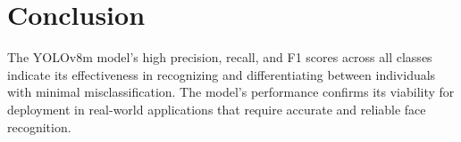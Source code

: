 \section{Conclusion}
The YOLOv8m model’s high precision, recall, and F1 scores across all classes indicate its effectiveness in recognizing and differentiating between individuals with minimal misclassification. The model’s performance confirms its viability for deployment in real-world applications that require accurate and reliable face recognition.
